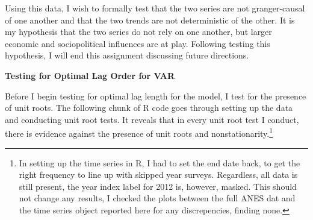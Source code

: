 \documentclass[12pt]{article}\usepackage[]{graphicx}\usepackage[]{color}
\newenvironment{knitrout}{}{} %
\begin{document}
\begin{flushleft}
\begin{center}
\begin{knitrout}
\end{knitrout}
\end{center}

Using this data, I wish to formally test that the two series are not granger-causal of one another and that the two trends are not deterministic of the other. It is my hypothesis that the two series do not rely on one another, but larger economic and sociopolitical influences are at play. Following testing this hypothesis, I will end this assignment discussing future directions.

\textbf{Testing for Optimal Lag Order for VAR}

Before I begin testing for optimal lag length for the model, I test for the presence of unit roots. The following chunk of R code goes through setting up the data and conducting unit root tests. It reveals that in every unit root test I conduct, there is evidence against the presence of unit roots and nonstationarity.\footnote{In setting up the time series in R, I had to set the end date back, to get the right frequency to line up with skipped year surveys. Regardless, all data is still present, the year index label for 2012 is, however, masked. This should not change any results, I checked the plots between the full ANES dat and the time series object reported here for any discrepencies, finding none.}


\end{flushleft}
\end{document}
